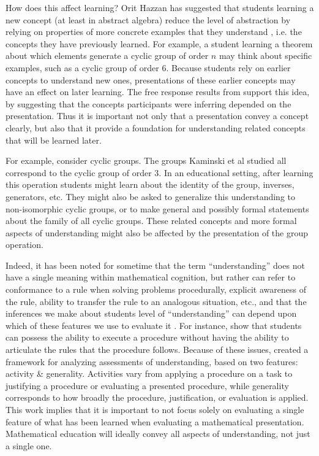\documentclass[man,10pt]{apa6}
\begin{document}
How does this affect learning? Orit Hazzan has suggested that students learning a new concept (at least in abstract algebra) reduce the level of abstraction by relying on properties of more concrete examples that they understand \cite{Hazzan1999}, i.e. the concepts they have previously learned. For example, a student learning a theorem about which elements generate a cyclic group of order $n$ may think about specific examples, such as a cyclic group of order 6. Because students rely on earlier concepts to understand new ones, presentations of these earlier concepts may have an effect on later learning. The free response results from  support this idea, by suggesting that the concepts participants were inferring depended on the presentation. Thus it is important not only that a presentation convey a concept clearly, but also that it provide a foundation for understanding related concepts that will be learned later. \par
For example, consider cyclic groups. The groups Kaminski et al studied all correspond to the cyclic group of order 3. In an educational setting, after learning this operation students might learn about the identity of the group, inverses, generators, etc. They might also be asked to generalize this understanding to non-isomorphic cyclic groups, or to make general and possibly formal statements about the family of all cyclic groups. These related concepts and more formal aspects of understanding might also be affected by the presentation of the group operation. \par
Indeed, it has been noted for sometime that the term ``understanding'' does not have a single meaning within mathematical cognition, but rather can refer to conformance to a rule when solving problems procedurally, explicit awareness of the rule, ability to transfer the rule to an analogous situation, etc., and that the inferences we make about students level of ``understanding'' can depend upon which of these features we use to evaluate it \cite{Greeno1987,Bisanz1992}. For instance,  show that students can possess the ability to execute a procedure without having the ability to articulate the rules that the procedure follows. Because of these issues,  created a framework for analyzing assessments of understanding, based on two features: activity \& generality. Activities vary from applying a procedure on a task to justifying a procedure or evaluating a presented procedure, while generality corresponds to how broadly the procedure, justification, or evaluation is applied. This work implies that it is important to not focus solely on evaluating a single feature of what has been learned when evaluating a mathematical presentation. Mathematical education will ideally convey all aspects of understanding, not just a single one. \par 
\end{document}
